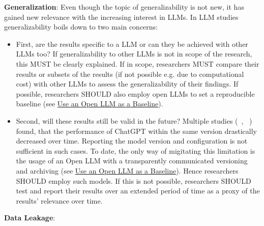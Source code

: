 \textbf{Generalization}:
Even though the topic of generalizability is not new, it has gained new relevance with the increasing interest in LLMs. In LLM studies generalizability boils down to two main concerns: 
\begin{itemize}
  \item First, are the results specific to a LLM or can they be achieved with other LLMs too? If generalizability to other LLMs is not in scope of the research, this MUST be clearly explained. If in scope, researchers MUST compare their results or subsets of the results (if not possible e.g. due to computational cost) with other LLMs to assess the generalizability of their findings. If possible, researchers SHOULD also employ open LLMs to set a reproducible baseline (see \href{/guidelines/#use-open-llm}{Use an Open LLM as a Baseline}).
  \item Second, will these results still be valid in the future? Multiple studies (~\cite{DBLP:journals/corr/abs-2307-09009}, ~\cite{doi:10.1148/radiol.232411}) found, that the performance of ChatGPT within the same version drastically decreased over time. Reporting the model version and configuration is not sufficient in such cases. To date, the only way of migitating this limitation is the usage of an Open LLM with a transparently communicated versioning and archiving (see \href{/guidelines/#use-open-llm}{Use an Open LLM as a Baseline}). Hence researchers SHOULD employ such models. If this is not possible, researchers SHOULD test and report their results over an extended period of time as a proxy of the results' relevance over time.
\end{itemize}

\textbf{Data Leakage}:


